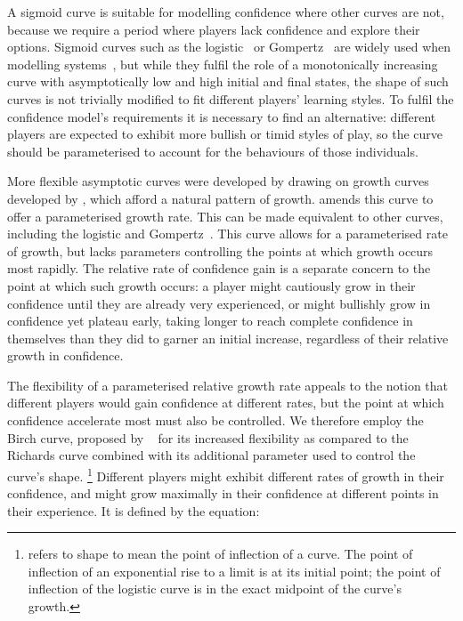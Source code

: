 A sigmoid curve is suitable for modelling confidence where other curves are not,
because we require a period where players lack confidence and explore their
options. Sigmoid curves such as the logistic~\cite{verhulst1845loi} or
Gompertz~\cite{gompertz1815curve} are widely used when modelling
systems~\cite{werker1997modelling}, but while they fulfil the role of a
monotonically increasing curve with asymptotically low and high initial and
final states, the shape of such curves is not trivially modified to fit
different players' learning styles. To fulfil the confidence model's
requirements it is necessary to find an alternative: different players are
expected to exhibit more bullish or timid styles of play, so the curve should be
parameterised to account for the behaviours of those individuals.

More flexible asymptotic curves were developed by
\citet{richards1959flexiblegrowth}
drawing on growth curves developed by \citet{von1938quantitative}, which afford
a natural pattern of growth. \citeauthor{richards1959flexiblegrowth} amends this
curve to offer a parameterised growth rate. This can be made equivalent to other
curves, including the logistic and Gompertz~\cite{france1984mathematical}. This
curve allows for a parameterised rate of growth, but lacks parameters
controlling the points at which growth occurs most rapidly. The relative rate of
confidence gain is a separate concern to the point at which such growth occurs:
a player might cautiously grow in their confidence until they are already very
experienced, or might bullishly grow in confidence yet plateau early, taking
longer to reach complete confidence in themselves than they did to garner an
initial increase, regardless of their relative growth in confidence.

The flexibility of a parameterised relative growth rate appeals to the notion
that different players would gain confidence at different rates, but the point
at which confidence accelerate most must also be controlled. We therefore employ
the Birch curve, proposed by \citeauthor{birch1999new}~\cite{birch1999new} for
its increased flexibility as compared to the Richards curve combined with its
additional parameter used to control the curve's shape.
\footnote{\citet{birch1999new} refers to shape to mean the point of
inflection of a curve. The point of inflection of an exponential rise to a limit
is at its initial point; the point of inflection of the logistic curve is in the
exact midpoint of the curve's growth.} Different players might exhibit different
rates of growth in their confidence, and might grow maximally in their
confidence at different points in their experience. It is defined by the
equation:

